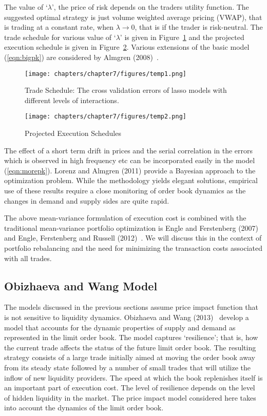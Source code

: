 The value of `$\lambda$', the price of risk depends on the traders utility function. The suggested optimal strategy is just volume weighted average pricing (VWAP), that is trading at a constant rate, when $\lambda \to 0$, that is if the trader is risk-neutral. The trade schedule for various value of `$\lambda$' is given in Figure~\ref{fig:7first} and the projected execution schedule is given in Figure~\ref{fig:7second}. Various extensions of the basic model (\ref{eqn:bigpk}) are considered by Almgren (2008)~\cite{alm2008}.
	\begin{figure}[!ht]
   	\centering
	    \texttt{[image: chapters/chapter7/figures/temp1.png]}
	   \caption{Trade Schedule: The cross validation errors of lasso models with different levels of interactions. \label{fig:7first}}
	\end{figure}
	\begin{figure}[!ht]
	   \centering
	    \texttt{[image: chapters/chapter7/figures/temp2.png]}
	   \caption{Projected Execution Schedules \label{fig:7second}}
	\end{figure}
The effect of a short term drift in prices and the serial correlation in the errors which is observed in high frequency etc can be incorporated easily in the model (\ref{eqn:morepk}). Lorenz and Almgren (2011) \cite{lovenz2011} provide a Bayesian approach to the optimization problem. While the methodology yields elegant solutions, empirical use of these results require a close monitoring of order book dynamics as the changes in demand and supply sides are quite rapid.


The above mean-variance formulation of execution cost is combined with the traditional mean-variance portfolio optimization is Engle and Ferstenberg (2007)~\cite{engle2007} and Engle, Ferstenberg and Russell (2012)~\cite{engle2012}. We will discuss this in the context of portfolio rebalancing and the need for minimizing the transaction costs associated with all trades. 


\subsection{Obizhaeva and Wang Model}


The models discussed in the previous sections assume price impact function that is not sensitive to liquidity dynamics. Obizhaeva and Wang (2013)~\cite{obizhaeva} develop a model that accounts for the dynamic properties of supply and demand as represented in the limit order book. The model captures `resilience'; that is, how the current trade affects the status of the future limit order book. The resulting strategy consists of a large trade initially aimed at moving the order book away from its steady state followed by a number of small trades that will utilize the inflow of new liquidity providers. The speed at which the book replenishes itself is an important part of execution cost. The level of resilience depends on the level of hidden liquidity in the market. The price impact model considered here takes into account the dynamics of the limit order book.


